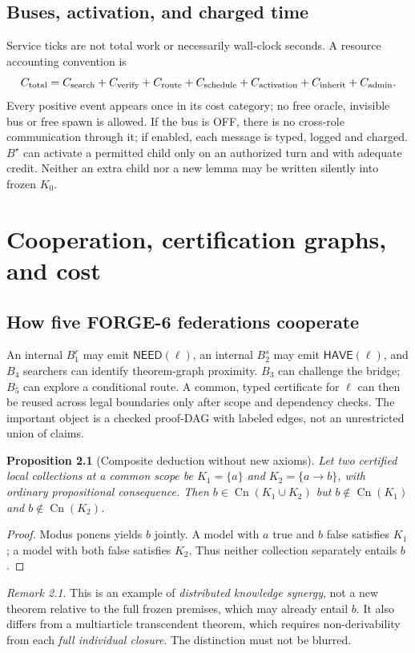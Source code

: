 \documentclass[11pt,letterpaper,oneside]{book}
\newtheorem{proposition}[theorem]{Proposition}
\theoremstyle{definition}
\theoremstyle{remark}
\newtheorem{remark}[theorem]{Remark}
\begin{document}
\section{Buses, activation, and charged time}
Service ticks are not total work or necessarily wall-clock seconds. A resource accounting convention is
\[
 C_{\rm total}=C_{\rm search}+C_{\rm verify}+C_{\rm route}
 +C_{\rm schedule}+C_{\rm activation}+C_{\rm inherit}+C_{\rm admin}.
\]
Every positive event appears once in its cost category; no free
oracle, invisible bus or free spawn is allowed. If the bus is OFF,
there is no cross-role communication through it; if enabled, each
message is typed, logged and charged. $B^\star$ can activate a
permitted child only on an authorized turn and with adequate credit.
Neither an extra child nor a new lemma may be written silently into
frozen $K_0$.

\chapter{Cooperation, certification graphs, and cost}
\section{How five FORGE-6 federations cooperate}
An internal $B_1^r$ may emit $\mathsf{NEED}(\ell)$, an internal
$B_2^s$ may emit $\mathsf{HAVE}(\ell)$, and $B_4$ searchers can
identify theorem-graph proximity. $B_3$ can challenge the bridge;
$B_5$ can explore a conditional route. A common, typed certificate
for $\ell$ can then be reused across legal boundaries only after
scope and dependency checks. The important object is a checked
proof-DAG with labeled edges, not an unrestricted union of claims.

\begin{proposition}[Composite deduction without new axioms]
Let two certified local collections at a \emph{common scope} be
$K_1=\{a\}$ and $K_2=\{a\to b\}$, with ordinary propositional
consequence. Then $b\in\operatorname{Cn}(K_1\cup K_2)$ but
$b\notin\operatorname{Cn}(K_1)$ and
$b\notin\operatorname{Cn}(K_2)$.
\end{proposition}
\begin{proof}
Modus ponens yields $b$ jointly. A model with $a$ true and $b$
false satisfies $K_1$; a model with both false satisfies $K_2$.
Thus neither collection separately entails $b$.\end{proof}
\begin{remark}
This is an example of \emph{distributed knowledge synergy}, not a
new theorem relative to the full frozen premises, which may already
entail $b$. It also differs from a multiarticle transcendent theorem,
which requires non-derivability from each \emph{full individual
closure}. The distinction must not be blurred.\end{remark}
\end{document}
